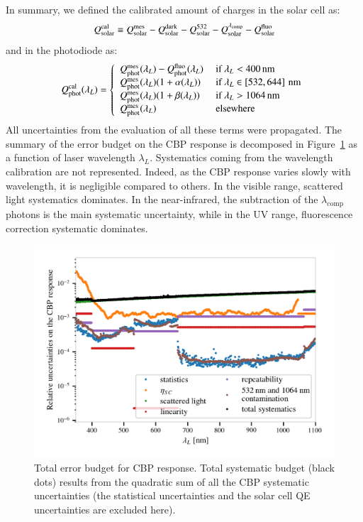 In summary, we defined the calibrated amount of charges in the solar cell as:
\begin{equation}
Q_{\mathrm{solar}}^{\mathrm{cal}} \equiv Q_{\mathrm{solar}}^{\mathrm{mes}} - Q_{\mathrm{solar}}^{\rm dark} - Q_{\mathrm{solar}}^{532} - Q_{\mathrm{solar}}^{\lambda_{\rm comp}} - Q_{\mathrm{solar}}^{\rm fluo}
\end{equation}
and in the photodiode as:
\begin{equation}
\Qphotcal(\lambda_L) = \left\lbrace
\begin{array}{ll}
          \Qphotmes(\lambda_L) - \Qphot^{\mathrm{fluo}}(\lambda_L) &\ \text{if}\ \lambda_L < \SI{400}{\nano\meter} \\
         \Qphotmes(\lambda_L)(1 + \alpha(\lambda_L)) &\ \text{if}\ \lambda_L \in \left[532, 644\right]\mathrm{\,nm} \\
        \Qphotmes(\lambda_L)(1 + \beta(\lambda_L)) &\ \text{if}\ \lambda_L > \SI{1064}{\nano\meter} \\
        \Qphotmes(\lambda_L)&\ \text{elsewhere}
\end{array}\right. 
\end{equation}
All uncertainties from the evaluation of all these terms were propagated. The summary of the error budget on the CBP response is decomposed in Figure~\ref{fig:cbp_budget} as a function of laser wavelength $\lambda_L$. Systematics coming from the wavelength calibration are not represented. Indeed, as the CBP response varies slowly with wavelength, it is negligible compared to others.  In the visible range, scattered light systematics dominates. In the near-infrared, the subtraction of the $\lambda_{\mathrm{comp}}$ photons is the main systematic uncertainty, while in the UV range, fluorescence correction systematic dominates.

\begin{figure}[h]
    \centering
    \includegraphics[width=\columnwidth]{fig/cbp_error_budget.png}
    \caption{Total error budget for CBP response. Total systematic budget (black dots) results from the quadratic sum of all the CBP systematic uncertainties (the statistical uncertainties and the solar cell QE uncertainties are excluded here).}
    \label{fig:cbp_budget}
\end{figure}

